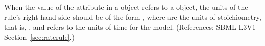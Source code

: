 When the value of the attribute  in a \RateRule object
refers to a \SpeciesReference object, the units of the rule's right-hand
side should be of the form , where  are
the units of stoichiometry, that is, , and
 refers to the units of time for the model.  (References:
SBML L3V1 Section~\ref{sec:raterule}.)
